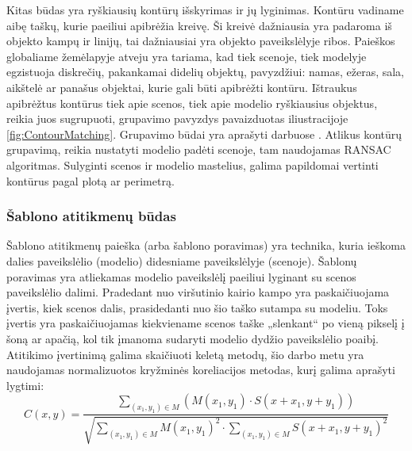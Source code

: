\documentclass[a4paper,12pt]{article}
\begin{document}
		Kitas būdas yra ryškiausių kontūrų išskyrimas ir jų lyginimas. Kontūru vadiname aibę taškų, kurie paeiliui apibrėžia kreivę. Ši kreivė dažniausia yra padaroma iš objekto kampų ir linijų, tai dažniausiai yra objekto paveikslėlyje ribos. Paieškos globaliame žemėlapyje atveju yra tariama, kad tiek scenoje, tiek modelyje egzistuoja diskrečių, pakankamai didelių objektų, pavyzdžiui: namas, ežeras, sala, aikštelė ar panašus objektai, kurie gali būti apibrėžti kontūru. Ištraukus apibrėžtus kontūrus tiek apie scenos, tiek apie modelio ryškiausius objektus, reikia juos sugrupuoti, grupavimo pavyzdys pavaizduotas iliustracijoje \ref{fig:ContourMatching}. Grupavimo būdai yra aprašyti darbuose \cite{ Abbasi99, cui2009curve, wang20072d}. Atlikus kontūrų grupavimą, reikia nustatyti modelio padėti scenoje, tam naudojamas \gls{RANSAC} algoritmas.
		Sulyginti scenos ir modelio mastelius, galima papildomai vertinti kontūrus pagal plotą ar perimetrą.
				
	\subsubsection{Šablono atitikmenų būdas}
		\label{sec:TemplateMathing}
		Šablono atitikmenų paieška (arba šablono poravimas) yra technika, kuria ieškoma dalies paveikslėlio (modelio) didesniame paveikslėlyje (scenoje). Šablonų poravimas yra atliekamas modelio paveikslėlį paeiliui lyginant su scenos paveikslėlio dalimi. Pradedant nuo viršutinio kairio kampo yra paskaičiuojama įvertis, kiek scenos dalis, prasidedanti nuo šio taško sutampa su modeliu. Toks įvertis yra paskaičiuojamas kiekviename scenos taške „slenkant“ po vieną pikselį į šoną ar apačią, kol tik įmanoma sudaryti modelio dydžio paveikslėlio poaibį. Atitikimo įvertinimą galima skaičiuoti keletą metodų, šio darbo metu yra naudojamas normalizuotos kryžminės koreliacijos metodas, kurį galima aprašyti lygtimi:
		\begin{equation}
		C(x,y) = \frac{\sum_{(x_1,y_1) \in M} \left( M(x_1,y_1) \cdot S(x+x_1, y + y_1) \right)}
		{\sqrt{\sum_{(x_1,y_1) \in M} M(x_1,y_1)^2 \cdot \sum_{(x_1,y_1) \in M} S(x+x_1, y + y_1)^2  }}
		\label{eq:TemplateMatching}
		\end{equation}	
		
\end{document}
